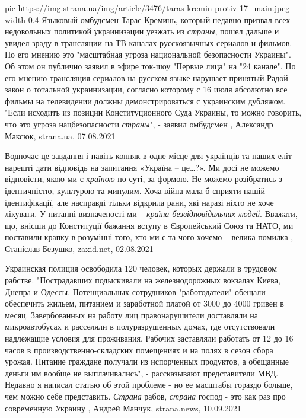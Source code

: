 \ifcmt
  pic https://img.strana.ua/img/article/3476/taras-kremin-protiv-17_main.jpeg
  width 0.4
\fi
Языковый омбудсмен Тарас Креминь, который недавно призвал всех недовольных
политикой украинизации уезжать из \emph{страны}, пошел дальше и увидел зраду в
трансляции на ТВ-каналах русскоязычных сериалов и фильмов. По его мнению это
"масштабная угроза национальной безопасности Украины".  Об этом он публично
заявил в эфире ток-шоу "Первые лица" на "24 канале".  По его мнению трансляция
сериалов на русском языке нарушает принятый Радой закон о тотальной
украинизации, согласно которому с 16 июля абсолютно все фильмы на телевидении
должны демонстрироваться с украинским дубляжом.  "Если исходить из позиции
Конституционного Суда Украины, то можно говорить, что это угроза
нацбезопасности \emph{страны}", - заявил омбудсмен
, 
Александр Максюк, strana.ua, 07.08.2021

Водночас це завдання і навіть копняк в одне місце для українців та наших еліт
нарешті дати відповідь на запитання «Україна – це…?». Ми досі не можемо
відповісти, якою ми є \emph{країною} по суті, за формою. Не можемо розібратись з
ідентичністю, культурою та минулим. Хоча війна мала б сприяти нашій
ідентифікації, але насправді тільки відкрила рани, які наразі ніхто не хоче
лікувати.  У питанні визначеності ми – \emph{країна безвідповідальних людей}. Вважати,
що, внісши до Конституції бажання вступу в Європейський Союз та НАТО, ми
поставили крапку в розумінні того, хто ми є та чого хочемо – велика помилка
, Станіслав Безушко, zaxid.net, 02.08.2021

Украинская полиция освободила 120 человек, которых держали в трудовом рабстве.
"Пострадавших подыскивали на железнодорожных вокзалах Киева, Днепра и Одессы.
Потенциальных сотрудников "работодатели" обещали обеспечить жильем, питанием и
заработной платой от 3000 до 4000 гривен в месяц. Завербованных на работу лиц
правонарушители доставляли на микроавтобусах и расселяли в полуразрушенных
домах, где отсутствовали надлежащие условия для проживания. Рабочих заставляли
работать от 12 до 16 часов в производственно-складских помещениях и на полях в
сезон сбора урожая. Питание граждане получали из испорченных продуктов, а
обещанные деньги им вообще не выплачивались", - рассказывают представители МВД.
Недавно я написал статью об этой проблеме - но ее масштабы гораздо больше, чем
можно себе представить. \emph{Страна} рабов, \emph{страна} господ - это как раз
про современную Украину
, Андрей Манчук, strana.news, 10.09.2021


